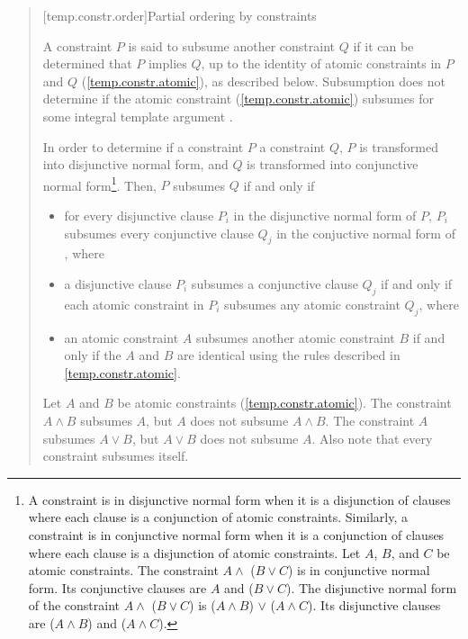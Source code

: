 \begin{quote}
\begin{addedblock}
[temp.constr.order]{Partial ordering by constraints}

\pnum
A constraint $P$ is said to subsume another constraint $Q$ 
if it can be determined that $P$ implies $Q$, up to 
the identity of atomic constraints in $P$ and $Q$
(\ref{temp.constr.atomic}), as described below.
% 
\enterexample
Subsumption does not determine if the atomic constraint 
 (\ref{temp.constr.atomic}) subsumes  for some 
integral template argument .
\exitexample

\pnum
In order to determine if a constraint $P$  a constraint
$Q$, $P$ is transformed into disjunctive normal form, 
and $Q$ is transformed into conjunctive normal form\footnote{
A constraint is in disjunctive normal form when it is a disjunction of
clauses where each clause is a conjunction of atomic constraints. 
% 
Similarly, a constraint is in conjunctive normal form when it is a conjunction 
of clauses where each clause is a disjunction of atomic constraints.
% 
\enterexample
Let $A$, $B$, and $C$ be atomic constraints.
% 
The constraint $A \land$ ($B \lor C$) is in 
conjunctive normal form.
% 
Its conjunctive clauses are $A$ and ($B \lor C$).
% 
The disjunctive normal form of the constraint
$A \land$ ($B \lor C$) 
is
($A \land B$) $\lor$ ($A \land C$).
% 
Its disjunctive clauses are ($A \land B$) and 
($A \land C$).
\exitexample
}.
% 
Then, $P$ subsumes $Q$ if and only if
\begin{itemize}
\item for every disjunctive clause $P_i$ in the disjunctive normal 
form of $P$, $P_i$ subsumes every conjunctive clause $Q_j$ 
in the conjuctive normal form of , where

\item a disjunctive clause $P_i$ subsumes a conjunctive clause
$Q_j$ if and only if each atomic constraint in $P_i$ subsumes 
any atomic constraint $Q_j$, where

\item an atomic constraint $A$ subsumes another atomic constraint
$B$ if and only if the $A$ and $B$ are identical using the
rules described in \ref{temp.constr.atomic}.
\end{itemize}
% 
\enterexample
Let $A$ and $B$ be atomic constraints (\ref{temp.constr.atomic}).
% 
The constraint $A \land B$ subsumes $A$, but $A$ does not subsume $A \land B$.
% 
The constraint $A$ subsumes $A \lor B$, but $A \lor B$ does not subsume $A$.
% 
Also note that every constraint subsumes itself.
\exitexample



\end{addedblock}
\end{quote}
